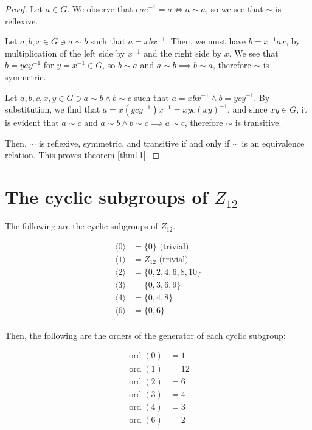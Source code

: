 \documentclass[12pt]{amsart}
\newcommand{\ord}{\operatorname{ord}}
\begin{document}
\begin{proof}
	Let $a \in G$.
	We observe that $eae^{-1} = a \iff a \sim a$,
	so we see that
	$\sim$ is reflexive.

	Let $a,b,x \in G \ni a \sim b$
	such that $a = xbx^{-1}$.
	Then, we must have $b = x^{-1}ax$,
	by multiplication of the left side by $x^{-1}$
	and the right side by $x$.
	We see that $b = yay^{-1}$ for $y = x^{-1} \in G$,
	so $b \sim a$ and $a \sim b \implies b \sim a$,
	therefore $\sim$ is symmetric.

	Let $a,b,c,x,y \in G \ni a \sim b \land b \sim c$
	such that $a = xbx^{-1} \land b = ycy^{-1}$.
	By substitution, we find that
	$a = x(ycy^{-1})x^{-1} = xyc(xy)^{-1}$,
	and since $xy \in G$, it is evident that
	$a \sim c$ and $a \sim b \land b \sim c \implies a \sim c$,
	therefore $\sim$ is transitive.

	Then,
	$\sim$ is
	reflexive,
	symmetric,
	and transitive
	if and only if
	$\sim$ is an equivalence relation.
	This proves theorem \ref{thm11}.
\end{proof}

\section{The cyclic subgroups of $Z_{12}$}

The following are the cyclic subgroups of $Z_{12}$.

\begin{align}
	\langle 0 \rangle & = \{0\} \text{ (trivial)} \\
	\langle 1 \rangle & = Z_{12} \text{ (trivial)} \\
	\langle 2 \rangle & = \{0, 2, 4, 6, 8, 10 \} \\
	\langle 3 \rangle & = \{0, 3, 6, 9 \} \\
	\langle 4 \rangle & = \{0, 4, 8 \} \\
	\langle 6 \rangle & = \{0, 6 \} \\
\end{align}

Then, the following are the orders of the generator of each cyclic subgroup:

\begin{align}
	\ord(0) & = 1 \\
	\ord(1) & = 12 \\
	\ord(2) & = 6 \\
	\ord(3) & = 4 \\
	\ord(4) & = 3 \\
	\ord(6) & = 2
\end{align}
\end{document}
